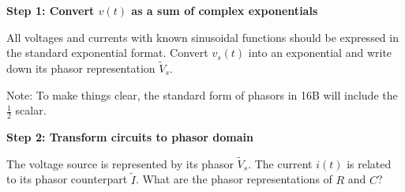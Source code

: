\begin{enumerate}

\qitem \textbf{Step 1: Convert $v(t)$ as a sum of complex exponentials}

All voltages and currents with known sinusoidal functions should be expressed in the standard exponential format.
Convert $v_s(t)$ into an exponential and write down its phasor representation $\widetilde{V}_s$.

Note: To make things clear, the standard form of phasors in 16B will include the $\frac{1}{2}$ scalar.




\qitem \textbf{Step 2: Transform circuits to phasor domain}

The voltage source is represented by its phasor $\widetilde{V}_s$.
The current $i(t)$ is related to its phasor counterpart $\widetilde{I}$. 
What are the phasor representations of $R$ and $C$?


\end{enumerate}
